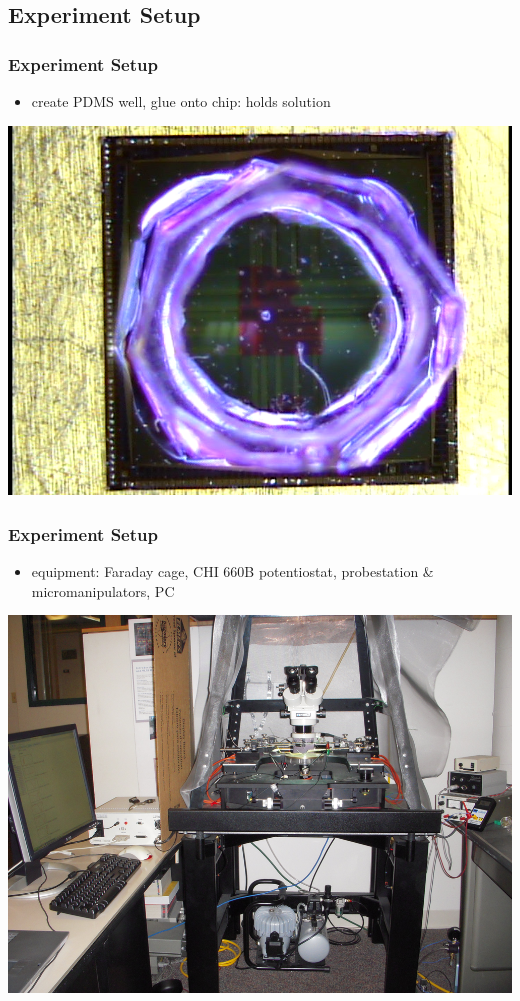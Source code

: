 \documentclass[10pt]{beamer}
\begin{document}
\subsection{Experiment Setup}
\begin{frame}
	\frametitle{Experiment Setup}
	\begin{itemize}
		\item create PDMS well, glue onto chip: holds solution
	\end{itemize}
	\includegraphics[width=\linewidth]{figures/chip-top.png}
\end{frame}

\begin{frame}
	\frametitle{Experiment Setup}
	\begin{itemize}
		\item equipment: Faraday cage, CHI 660B potentiostat, probestation \& micromanipulators, PC
	\end{itemize}
	\includegraphics[width=0.95\linewidth]{figures/probestation.png}
\end{frame}
\end{document}
